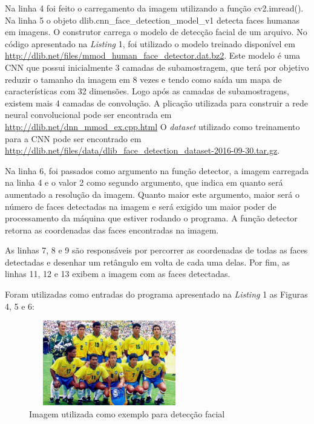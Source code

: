\documentclass[conference]{IEEEtran}
\begin{document}
         Na linha 4 foi feito o carregamento da imagem utilizando a função cv2.imread(). Na linha 5 o objeto dlib.cnn\_face\_detection\_model\_v1 detecta faces humanas em imagens. O construtor carrega o modelo de detecção facial de um arquivo. No código apresentado na \textit{Listing} 1, foi utilizado o modelo treinado disponível em \url{http://dlib.net/files/mmod\_human\_face\_detector.dat.bz2}. Este modelo é uma CNN que possui inicialmente 3 camadas de subamostragem, que terá por objetivo reduzir o tamanho da imagem em 8 vezes e tendo como saída um mapa de características com 32 dimensões. Logo após as camadas de subamostragens, existem mais 4 camadas de convolução. A plicação utilizada para construir a rede neural convolucional pode ser encontrada em \url{http://dlib.net/dnn\_mmod\_ex.cpp.html} O \textit{dataset} utilizado como treinamento para a CNN pode ser encontrado em \url{http://dlib.net/files/data/dlib_face_detection_dataset-2016-09-30.tar.gz}.
         
         Na linha 6, foi passados como argumento na função detector, a imagem carregada na linha 4 e o valor 2 como segundo argumento, que indica em quanto será aumentado a resolução da imagem. Quanto maior este argumento, maior será o número de faces detectadas na imagem e será exigido um maior poder de processamento da máquina que estiver rodando o programa. A função detector retorna as coordenadas das faces encontradas na imagem.
         
         As linhas 7, 8 e 9 são responsáveis por percorrer as coordenadas de todas as faces detectadas e desenhar um retângulo em volta de cada uma delas. Por fim, as linhas 11, 12 e 13 exibem a imagem com as faces detectadas.
         
         Foram utilizadas como entradas do programa apresentado na \textit{Listing} 1 as Figuras 4, 5 e 6:
         
         \begin{figure}[h!b]
			\centering \includegraphics[width=7cm,height=3.7cm]{brasil_1994.jpg}
			\caption{Imagem utilizada como exemplo para detecção facial \cite{b5}} 
		\end{figure}
		
\end{document}
